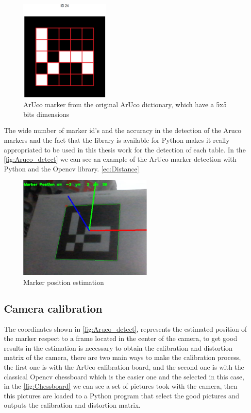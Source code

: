 \begin{figure}[h!]
    \centering
 	\includegraphics[trim=0 0 0 0,clip,width=0.4\textwidth]{Figs/ArUco24.png}
    \caption{ArUco marker from the original ArUco dictionary, which have a 5x5 bits dimensions}
    \label{fig:Aruco_bits}
\end{figure}

The wide number of marker id's and the accuracy in the detection of the Aruco markers and the fact that the library is available for Python makes it really appropriated to be used in this thesis work for the detection of each table. In the \autoref{fig:Aruco_detect}  we can see an example of the ArUco marker detection with Python and the Opencv library. \autoref{eq:Distance}

\begin{figure}[H]
    \centering
 	\includegraphics[trim=0 0 0 0,clip,width=0.6\textwidth]{Figs/Aruco.JPG}
    \caption{Marker position estimation}
    \label{fig:Aruco_detect}
\end{figure}

\subsection{Camera calibration}

The coordinates shown in \autoref{fig:Aruco_detect}, represents the estimated position of the marker respect to a frame located in the center of the camera, to get good results in the estimation is necessary to obtain the calibration and distortion matrix of the camera, there are two main ways to make the calibration process, the first one is with the ArUco calibration board, and the second one is with the classical Opencv chessboard which is the easier one and the selected in this case, in the \autoref{fig:Chessboard} we can see a set of pictures took with the camera, then this pictures are loaded to a Python program that select the good pictures and outputs the calibration and distortion matrix.

